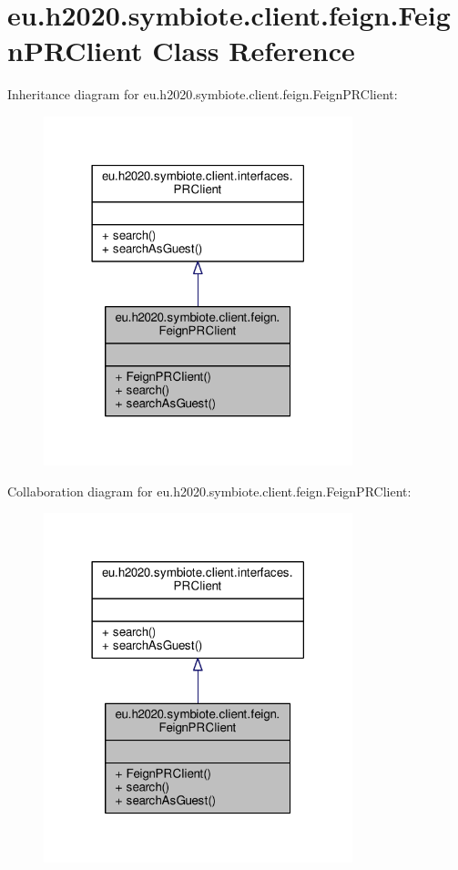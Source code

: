 \hypertarget{classeu_1_1h2020_1_1symbiote_1_1client_1_1feign_1_1FeignPRClient}{}\section{eu.\+h2020.\+symbiote.\+client.\+feign.\+Feign\+P\+R\+Client Class Reference}
\label{classeu_1_1h2020_1_1symbiote_1_1client_1_1feign_1_1FeignPRClient}


Inheritance diagram for eu.\+h2020.\+symbiote.\+client.\+feign.\+Feign\+P\+R\+Client\+:
\nopagebreak
\begin{figure}[H]
\begin{center}
\leavevmode
\includegraphics[width=254pt]{classeu_1_1h2020_1_1symbiote_1_1client_1_1feign_1_1FeignPRClient__inherit__graph}
\end{center}
\end{figure}


Collaboration diagram for eu.\+h2020.\+symbiote.\+client.\+feign.\+Feign\+P\+R\+Client\+:
\nopagebreak
\begin{figure}[H]
\begin{center}
\leavevmode
\includegraphics[width=254pt]{classeu_1_1h2020_1_1symbiote_1_1client_1_1feign_1_1FeignPRClient__coll__graph}
\end{center}
\end{figure}
